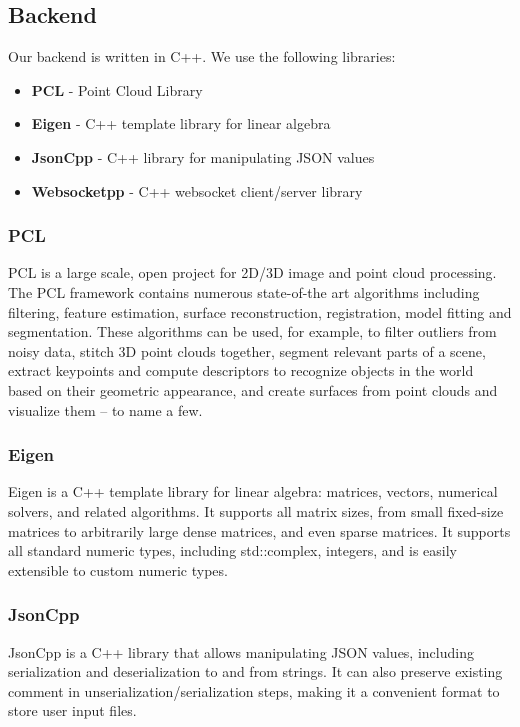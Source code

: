 \documentclass[11pt, a4paper,oneside,chapterprefix=false]{scrbook}
\begin{document}
\subsection{Backend}
Our backend is written in C++. We use the following libraries:
\begin{itemize}
	\item \textbf{PCL} - Point Cloud Library
	\item \textbf{Eigen} - C++ template library for linear algebra
	\item \textbf{JsonCpp} - C++ library for manipulating JSON values
	\item \textbf{Websocketpp} - C++ websocket client/server library
\end{itemize}

\subsubsection{PCL}
PCL is a large scale, open project for 2D/3D image and point cloud processing. The PCL framework contains numerous state-of-the art algorithms including filtering, feature estimation, surface reconstruction, registration, model fitting and segmentation. These algorithms can be used, for example, to filter outliers from noisy data, stitch 3D point clouds together, segment relevant parts of a scene, extract keypoints and compute descriptors to recognize objects in the world based on their geometric appearance, and create surfaces from point clouds and visualize them -- to name a few.

\subsubsection{Eigen}
Eigen is a C++ template library for linear algebra: matrices, vectors, numerical solvers, and related algorithms. It supports all matrix sizes, from small fixed-size matrices to arbitrarily large dense matrices, and even sparse matrices. It supports all standard numeric types, including std::complex, integers, and is easily extensible to custom numeric types.

\subsubsection{JsonCpp}
JsonCpp is a C++ library that allows manipulating JSON values, including serialization and deserialization to and from strings. It can also preserve existing comment in unserialization/serialization steps, making it a convenient format to store user input files.
\end{document}
